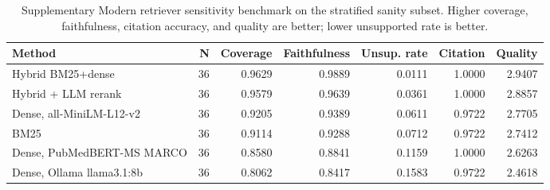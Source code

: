\documentclass{article}
\begin{document}
\begin{table}[!ht]
\caption{Supplementary Modern retriever sensitivity benchmark on the stratified sanity subset. Higher coverage, faithfulness, citation accuracy, and quality are better; lower unsupported rate is better.}
\label{stab:modern-retriever-sensitivity}
\centering
\scriptsize
\begin{adjustbox}{max width=\textwidth}
\begin{tabular}{@{}lrrrrrr@{}}
\toprule
Method & N & Coverage & Faithfulness & Unsup. rate & Citation & Quality \\
\midrule
Hybrid BM25+dense & 36 & 0.9629 & 0.9889 & 0.0111 & 1.0000 & 2.9407 \\
Hybrid + LLM rerank & 36 & 0.9579 & 0.9639 & 0.0361 & 1.0000 & 2.8857 \\
Dense, all-MiniLM-L12-v2 & 36 & 0.9205 & 0.9389 & 0.0611 & 0.9722 & 2.7705 \\
BM25 & 36 & 0.9114 & 0.9288 & 0.0712 & 0.9722 & 2.7412 \\
Dense, PubMedBERT-MS MARCO & 36 & 0.8580 & 0.8841 & 0.1159 & 1.0000 & 2.6263 \\
Dense, Ollama llama3.1:8b & 36 & 0.8062 & 0.8417 & 0.1583 & 0.9722 & 2.4618 \\
\bottomrule
\end{tabular}
\end{adjustbox}
\end{table}
\end{document}

